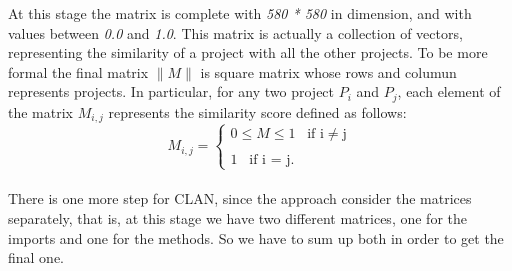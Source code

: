 At this stage the matrix is complete with \emph{580 * 580} in dimension, and with values between \emph{0.0} and \emph{1.0}.
This matrix is actually a collection of vectors, representing the similarity of a project with all the other projects.
To be more formal the final matrix $\| M \|$ is square matrix whose rows and columun represents projects. In particular, for any two project $P_i$ and $P_j$, each element of the matrix $M_{i,j}$ represents the similarity score defined as follows: \\

\begin{equation}
  M_{i,j}=\begin{cases}
    0\leq M \leq 1 \; \; \; \text{if i} \neq \text{j}\\
    \\
    1 \; \; \; \text{if i = j}.
  \end{cases}
\end{equation}\\

There is one more step for CLAN, since the approach consider the matrices separately, that is, at this stage we have two different matrices, one for the imports and one for the methods. So we have to sum up both in order to get the final one.

\newpage
